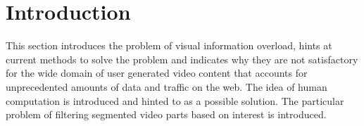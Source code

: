 \chapter{Introduction}
\label{ch:introduction}

This section introduces the problem of visual information overload, hints at current methods to solve the problem and indicates why they are not satisfactory for the wide domain of user generated video content that accounts for unprecedented amounts of data and traffic on the web. The idea of human computation is introduced and hinted to as a possible solution. The particular problem of filtering segmented video parts based on interest is introduced.

 
